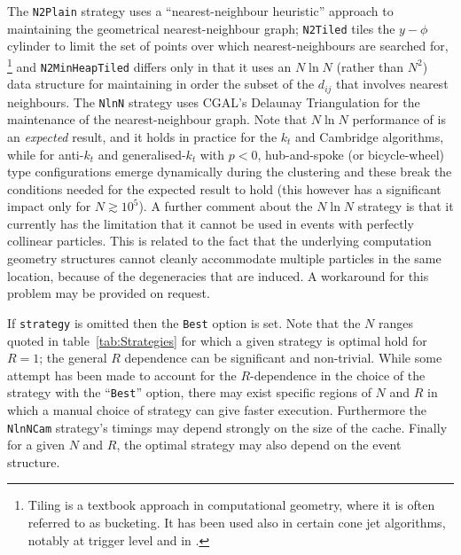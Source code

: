 \documentclass[12pt,a4]{article}
\newcommand{\ttt}[1]{{\small\texttt{#1}}}
\begin{document}
The \ttt{N2Plain} strategy uses a ``nearest-neighbour heuristic''
\cite{Anderberg} approach to maintaining the geometrical
nearest-neighbour graph; \ttt{N2Tiled} tiles the $y-\phi$ cylinder
to limit the set of points over which nearest-neighbours are searched
for,%
\footnote{Tiling is a textbook approach in computational geometry,
  where it is often referred to as bucketing. It has been used also in
  certain cone jet algorithms, notably at trigger level and in
  \cite{Sonnenschein}.} %
and \ttt{N2MinHeapTiled} differs only in that it uses an $N\ln N$
(rather than $N^2$) data structure for maintaining in order the subset
of the $d_{ij}$ that involves nearest neighbours.
%
The \ttt{NlnN} strategy uses CGAL's Delaunay Triangulation
\cite{CGAL} for the maintenance of the nearest-neighbour graph.
%
Note that $N \ln N$ performance of is an \emph{expected} result, and
it holds in practice for the $k_t$ and Cambridge algorithms, while for
anti-$k_t$ and generalised-$k_t$ with $p<0$, hub-and-spoke
(or bicycle-wheel) type configurations emerge dynamically during the
clustering and these break the conditions needed for the expected
result to hold (this however has a significant impact only for $N
\gtrsim 10^5$).
%
A further comment about the $N \ln N$ strategy is that it currently
has the limitation that it cannot be used in events with perfectly
collinear particles.
%
This is related to the fact that the underlying computation geometry
structures cannot cleanly accommodate multiple particles in the same
location, because of the degeneracies that are induced. 
%
A workaround for this problem may be provided on request.

If \ttt{strategy} is omitted then the \ttt{Best} option is set.  
%
Note that the $N$ ranges quoted in table~\ref{tab:Strategies} for
which a given strategy is optimal hold for $R=1$; the general $R$
dependence can be significant and non-trivial.
%
While some attempt has been made to account for the $R$-dependence in
the choice of the strategy with the ``\ttt{Best}'' option, there may
exist specific regions of $N$ and $R$ in which a manual choice of
strategy can give faster execution.
%
Furthermore the \ttt{NlnNCam} strategy's timings may depend
strongly on the size of the cache.
Finally for a given $N$ and $R$, the optimal strategy may also depend
on the event structure.
\end{document}
